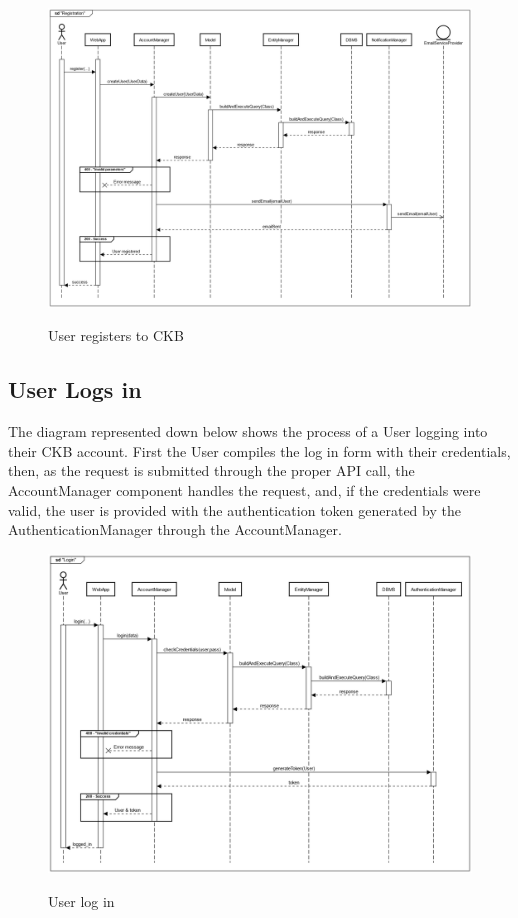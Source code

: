 \documentclass{Configuration_Files/Template}
\begin{document}
\begin{figure}[H]
\centering
\includegraphics[scale = 0.33]{Images/diagrams/sequences/UserRegisters.png}\\
\caption{User registers to CKB}
\end{figure}

\subsection{User Logs in}

The diagram represented down below shows the process of a User logging into their CKB account. First the User compiles the log in form with their credentials, then, as the request is submitted through the proper API call, the AccountManager component handles the request, and, if the credentials were valid, the user is provided with the authentication token generated by the AuthenticationManager through the AccountManager.

\begin{figure}[H]
\centering
\includegraphics[scale = 0.33]{Images/diagrams/sequences/UserLogsIn.png}\\
\caption{User log in}
\end{figure}
\end{document}
